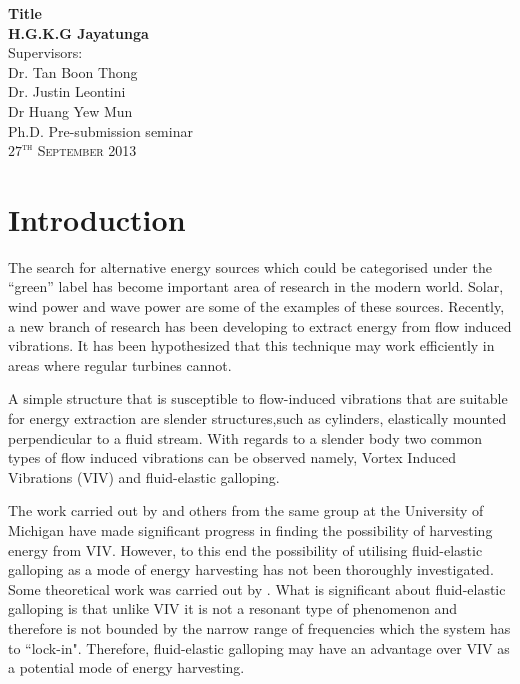 \documentclass[authoryear,12pt]{article}
\begin{document}
\begin{titlepage}
\begin{center}
{\huge \bfseries Title}\\[2.5cm]
{\LARGE \bfseries H.G.K.G Jayatunga}\\[2.5cm]
\Large Supervisors:\\[0.5cm] Dr. Tan Boon Thong \\[0.4cm] Dr. Justin Leontini \\[0.5cm] Dr Huang Yew Mun\\[6.5cm]
\Large Ph.D. Pre-submission seminar\\

\vfill
\textsc{\Large $27^{\text{th}}$ September 2013}
\end{center}
\end{titlepage}
\tableofcontents
\clearpage
\section{Introduction}
\label{sec:intro}
The search for alternative energy sources which could be categorised under the ``green” label has become important area of research in the modern world. Solar, wind power and wave power are some of the examples of these sources. Recently, a new branch of research has been developing to extract energy from flow induced vibrations. It has been hypothesized that this technique may work efficiently in areas where regular turbines cannot.
 
A simple structure that is susceptible to flow-induced vibrations that are suitable for energy extraction are slender structures,such as cylinders, elastically mounted perpendicular to a fluid stream. With regards to a slender body two common types of flow induced vibrations can be observed namely, Vortex Induced Vibrations (VIV) and fluid-elastic galloping. 

The work carried out by \citet{Bernitsas2008a-concept, Bernitsas2009, Raghavan2010a,Lee2011b} and others from the same group at the University of Michigan have made significant progress in finding the possibility of harvesting energy from VIV. However, to this end the possibility of utilising fluid-elastic galloping as a mode of energy harvesting has not been thoroughly investigated. Some theoretical work was carried out by \cite{Barrero-Gil2010a}. What is significant about fluid-elastic galloping is that unlike VIV it is not a resonant type of phenomenon and therefore is not bounded by the narrow range of frequencies which the system has to ``lock-in". Therefore, fluid-elastic galloping may have an advantage over VIV as a potential mode of energy harvesting. 
\end{document}
